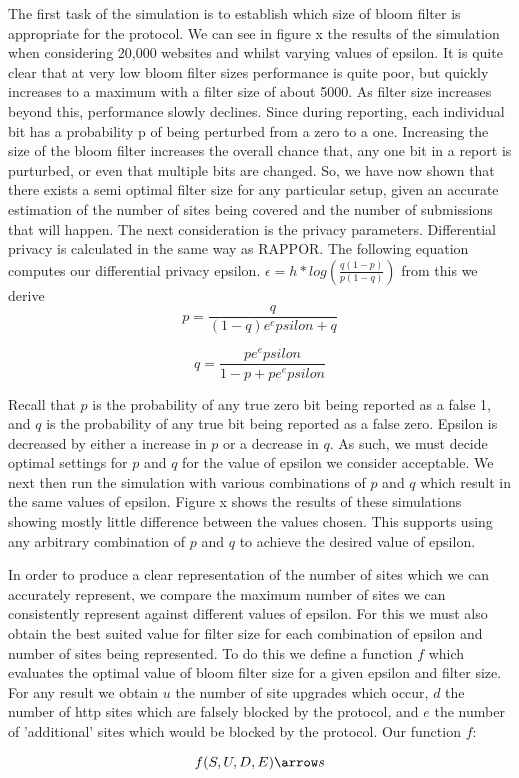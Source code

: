 \documentclass[11pt]{article}
\begin{document}
The first task of the simulation is to establish which size of bloom filter is appropriate for the protocol. We can see in figure x the results of the simulation when considering 20,000 websites and whilst varying values of epsilon. It is quite clear that at very low bloom filter sizes performance is quite poor, but quickly increases to a maximum with a filter size of about 5000. As filter size increases beyond this, performance slowly declines. Since during reporting, each individual bit has a probability p of being perturbed from a zero to a one. Increasing the size of the bloom filter increases the overall chance that, any one bit in a report is purturbed, or even that multiple bits are changed. So, we have now shown that there exists a semi optimal filter size for any particular setup, given an accurate estimation of the number of sites being covered and the number of submissions that will happen. The next consideration is the privacy parameters. Differential privacy is calculated in the same way as RAPPOR. The following equation computes our differential privacy epsilon. \(\epsilon = h * log(\frac{q(1-p)}{p(1-q)})\) from this we derive $$p = \frac{q}{(1-q)e^epsilon + q}$$

$$q = \frac{p e^epsilon}{1-p+pe^epsilon}$$

Recall that \(p\) is the probability of any true zero bit being reported as a false 1, and \(q\) is the probability of any true bit being reported as a false zero. Epsilon is decreased by either a increase in \(p\) or a decrease in \(q\). As such, we must decide optimal settings for \(p\) and \(q\) for the value of epsilon we consider acceptable. We next then run the simulation with various combinations of \(p\) and \(q\) which result in the same values of epsilon. Figure x shows the results of these simulations showing mostly little difference between the values chosen. This supports using any arbitrary combination of \(p\) and \(q\) to achieve the desired value of epsilon.

In order to produce a clear representation of the number of sites which we can accurately represent, we compare the maximum number of sites we can consistently represent against different values of epsilon. For this we must also obtain the best suited value for filter size for each combination of epsilon and number of sites being represented. To do this we define a function \(f\) which evaluates the optimal value of bloom filter size for a given epsilon and filter size. For any result we obtain \(u\) the number of site upgrades which occur, \(d\) the number of http sites which are falsely blocked by the protocol, and \(e\) the number of 'additional' sites which would be blocked by the protocol. Our function \(f\):

$$f(S,U,D,E) \arrow s$$
\end{document}
